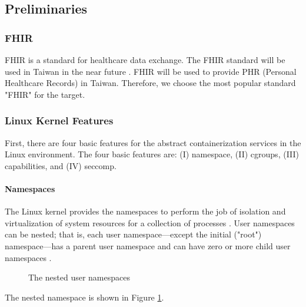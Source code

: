\documentclass[12pt,a4paper]{article}
\begin{document}
\subsection{Preliminaries}
\hypertarget{preliminaries}{}
\subsubsection{FHIR}
FHIR is a standard for healthcare data exchange. The FHIR standard will be used
in Taiwan in the near future \cite{MOHW_FHIR}. FHIR will be used to provide PHR
(Personal Healthcare Records) in Taiwan. Therefore, we choose the most popular standard
"FHIR" for the target.

\subsubsection{Linux Kernel Features}
First, there are four basic features for the abstract containerization services in the
Linux environment.
The four basic features are: (\RN{1}) namespace, (\RN{2}) cgroups, (\RN{3}) capabilities,
and (\RN{4}) seccomp.

\paragraph{Namespaces}
The Linux kernel provides the namespaces to perform the job of isolation and virtualization
of system resources for a collection of processes \cite{Road_Ahead}.
User namespaces can be nested; that is, each user namespace—except the initial ("root")
namespace—has a parent user namespace and can have zero or more child user namespaces
\cite{user_namespaces}.

\begin{figure}
  \centering
  \caption[]{The nested user namespaces}
  \label{Nested}

\end{figure}
The nested namespace is shown in Figure \ref*{Nested}.
\end{document}
